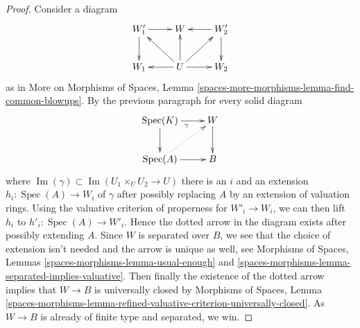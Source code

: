 \documentclass[10pt,a4paper]{amsart}
\theoremstyle{plain}
\theoremstyle{definition}
\theoremstyle{remark}
\numberwithin{equation}{subsection}
\def\Spec{\mathop{\mathrm{Spec}}}
\def\Im{\mathop{\mathrm{Im}}}
\begin{document}
\begin{proof}
\medskip\noindent
Consider a diagram
$$
\xymatrix{
W_1' \ar[d] \ar[r] & W & W_2' \ar[l] \ar[d] \\
W_1 & U \ar[l] \ar[lu] \ar[u] \ar[ru] \ar[r] & W_2
}
$$
as in More on Morphisms of Spaces, Lemma
\ref{spaces-more-morphisms-lemma-find-common-blowups}.
By the previous paragraph for every solid diagram
$$
\xymatrix{
\Spec(K) \ar[r]_\gamma  \ar[d] & W \ar[d] \\
\Spec(A) \ar@{..>}[ru] \ar[r] & B
}
$$
where $\Im(\gamma) \subset \Im(U_1 \times_U U_2 \to U)$
there is an $i$ and an extension $h_i : \Spec(A) \to W_i$ of $\gamma$
after possibly replacing $A$ by an extension of valuation rings.
Using the valuative criterion of properness for $W'_i \to W_i$,
we can then lift $h_i$ to $h'_i : \Spec(A) \to W'_i$.
Hence the dotted arrow in the diagram exists after possibly
extending $A$. Since $W$ is separated over $B$, we see that the choice
of extension isn't needed and the arrow is unique as well, see
Morphisms of Spaces, Lemmas \ref{spaces-morphisms-lemma-usual-enough}
and \ref{spaces-morphisms-lemma-separated-implies-valuative}.
Then finally the existence of the dotted arrow
implies that $W \to B$ is universally closed by
Morphisms of Spaces, Lemma
\ref{spaces-morphisms-lemma-refined-valuative-criterion-universally-closed}.
As $W \to B$ is already of finite type and separated, we win.
\end{proof}
\end{document}
